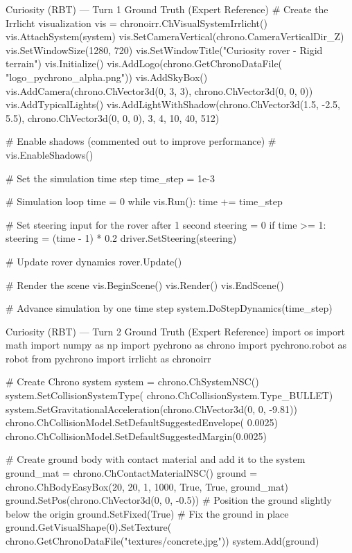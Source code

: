 \documentclass{ieeeaccess}
\begin{document}
\begin{appendices}
\begin{CodeBlock}{Curiosity (RBT) --- Turn 1 Ground Truth (Expert Reference)}
# Create the Irrlicht visualization
vis = chronoirr.ChVisualSystemIrrlicht()
vis.AttachSystem(system)
vis.SetCameraVertical(chrono.CameraVerticalDir_Z)
vis.SetWindowSize(1280, 720)
vis.SetWindowTitle("Curiosity rover - Rigid terrain")
vis.Initialize()
vis.AddLogo(chrono.GetChronoDataFile(
    "logo_pychrono_alpha.png"))
vis.AddSkyBox()
vis.AddCamera(chrono.ChVector3d(0, 3, 3), chrono.ChVector3d(0, 0, 0))
vis.AddTypicalLights()
vis.AddLightWithShadow(chrono.ChVector3d(1.5, -2.5, 5.5), chrono.ChVector3d(0, 0, 0), 3, 4, 10, 40, 512)

# Enable shadows (commented out to improve performance)
# vis.EnableShadows()

# Set the simulation time step
time_step = 1e-3

# Simulation loop
time = 0
while vis.Run():
    time += time_step

    # Set steering input for the rover after 1 second
    steering = 0
    if time >= 1:
        steering = (time - 1) * 0.2
    driver.SetSteering(steering)

    # Update rover dynamics
    rover.Update()

    # Render the scene
    vis.BeginScene()
    vis.Render()
    vis.EndScene()

    # Advance simulation by one time step
    system.DoStepDynamics(time_step)
\end{CodeBlock}

\begin{CodeBlock}{Curiosity (RBT) --- Turn 2 Ground Truth (Expert Reference)}
import os
import math
import numpy as np
import pychrono as chrono
import pychrono.robot as robot
from pychrono import irrlicht as chronoirr

# Create Chrono system
system = chrono.ChSystemNSC()
system.SetCollisionSystemType(
    chrono.ChCollisionSystem.Type_BULLET)
system.SetGravitationalAcceleration(chrono.ChVector3d(0, 0, -9.81))
chrono.ChCollisionModel.SetDefaultSuggestedEnvelope(
    0.0025)
chrono.ChCollisionModel.SetDefaultSuggestedMargin(0.0025)

# Create ground body with contact material and add it to the system
ground_mat = chrono.ChContactMaterialNSC()
ground = chrono.ChBodyEasyBox(20, 20, 1, 1000, True, True, ground_mat)
ground.SetPos(chrono.ChVector3d(0, 0, -0.5))  # Position the ground slightly below the origin
ground.SetFixed(True)  # Fix the ground in place
ground.GetVisualShape(0).SetTexture(
    chrono.GetChronoDataFile("textures/concrete.jpg"))
system.Add(ground)


\end{CodeBlock}
\end{appendices}
\end{document}
